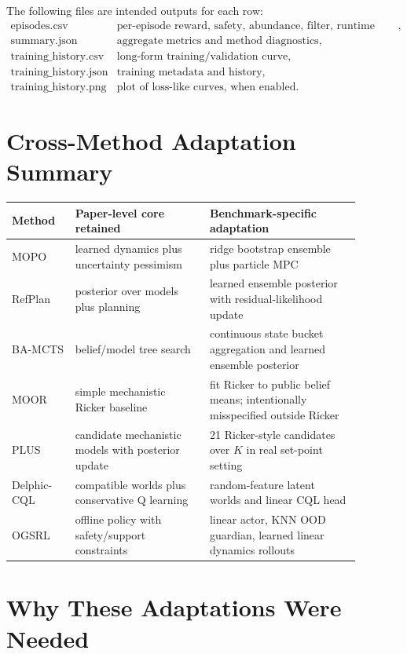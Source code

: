 \documentclass[11pt]{article}
\newcommand{\1}{\mathbf{1}}
\begin{document}
The following files are intended outputs for each row:
\[
\begin{array}{ll}
\text{episodes.csv} & \text{per-episode reward, safety, abundance, filter, runtime metrics},\\
\text{summary.json} & \text{aggregate metrics and method diagnostics},\\
\text{training\_history.csv} & \text{long-form training/validation curve},\\
\text{training\_history.json} & \text{training metadata and history},\\
\text{training\_history.png} & \text{plot of loss-like curves, when enabled}.
\end{array}
\]

\section{Cross-Method Adaptation Summary}

\begin{center}
\begin{longtable}{p{0.16\linewidth}p{0.34\linewidth}p{0.38\linewidth}}
\toprule
Method & Paper-level core retained & Benchmark-specific adaptation \\
\midrule
\endhead
MOPO & learned dynamics plus uncertainty pessimism & ridge bootstrap ensemble plus particle MPC \\
RefPlan & posterior over models plus planning & learned ensemble posterior with residual-likelihood update \\
BA-MCTS & belief/model tree search & continuous state bucket aggregation and learned ensemble posterior \\
MOOR & simple mechanistic Ricker baseline & fit Ricker to public belief means; intentionally misspecified outside Ricker \\
PLUS & candidate mechanistic models with posterior update & 21 Ricker-style candidates over $K$ in real set-point setting \\
Delphic-CQL & compatible worlds plus conservative Q learning & random-feature latent worlds and linear CQL head \\
OGSRL & offline policy with safety/support constraints & linear actor, KNN OOD guardian, learned linear dynamics rollouts \\
\bottomrule
\end{longtable}
\end{center}

\section{Why These Adaptations Were Needed}
\end{document}
